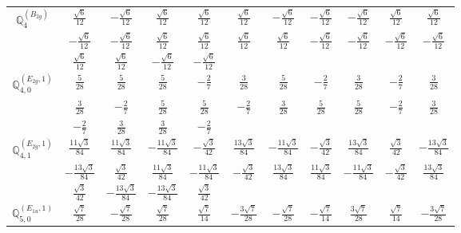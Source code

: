 \documentclass[fleqn,10pt,landscape]{article}
\begin{document}
\begin{itemize}
{\begin{center}
\begin{longtable}{ccccccccccc}
$\mathbb{Q}_{4}^{(B_{2g})}$ & $ \frac{\sqrt{6}}{12} $ & $ - \frac{\sqrt{6}}{12} $ & $ \frac{\sqrt{6}}{12} $ & $ \frac{\sqrt{6}}{12} $ & $ \frac{\sqrt{6}}{12} $ & $ - \frac{\sqrt{6}}{12} $ & $ - \frac{\sqrt{6}}{12} $ & $ - \frac{\sqrt{6}}{12} $ & $ \frac{\sqrt{6}}{12} $ & $ \frac{\sqrt{6}}{12} $ \\
& $ - \frac{\sqrt{6}}{12} $ & $ - \frac{\sqrt{6}}{12} $ & $ \frac{\sqrt{6}}{12} $ & $ \frac{\sqrt{6}}{12} $ & $ \frac{\sqrt{6}}{12} $ & $ \frac{\sqrt{6}}{12} $ & $ - \frac{\sqrt{6}}{12} $ & $ - \frac{\sqrt{6}}{12} $ & $ - \frac{\sqrt{6}}{12} $ & $ - \frac{\sqrt{6}}{12} $ \\
& $ \frac{\sqrt{6}}{12} $ & $ \frac{\sqrt{6}}{12} $ & $ - \frac{\sqrt{6}}{12} $ & $ - \frac{\sqrt{6}}{12} $ & $  $ & $  $ & $  $ & $  $ & $  $ & $  $ \\ \hline
$\mathbb{Q}_{4,0}^{(E_{2g},1)}$ & $ \frac{5}{28} $ & $ \frac{5}{28} $ & $ \frac{5}{28} $ & $ - \frac{2}{7} $ & $ \frac{3}{28} $ & $ \frac{5}{28} $ & $ - \frac{2}{7} $ & $ \frac{3}{28} $ & $ - \frac{2}{7} $ & $ \frac{3}{28} $ \\
& $ \frac{3}{28} $ & $ - \frac{2}{7} $ & $ \frac{5}{28} $ & $ \frac{5}{28} $ & $ - \frac{2}{7} $ & $ \frac{3}{28} $ & $ \frac{5}{28} $ & $ \frac{5}{28} $ & $ - \frac{2}{7} $ & $ \frac{3}{28} $ \\
& $ - \frac{2}{7} $ & $ \frac{3}{28} $ & $ \frac{3}{28} $ & $ - \frac{2}{7} $ & $  $ & $  $ & $  $ & $  $ & $  $ & $  $ \\ \hline
$\mathbb{Q}_{4,1}^{(E_{2g},1)}$ & $ \frac{11 \sqrt{3}}{84} $ & $ \frac{11 \sqrt{3}}{84} $ & $ - \frac{11 \sqrt{3}}{84} $ & $ - \frac{\sqrt{3}}{42} $ & $ \frac{13 \sqrt{3}}{84} $ & $ - \frac{11 \sqrt{3}}{84} $ & $ - \frac{\sqrt{3}}{42} $ & $ \frac{13 \sqrt{3}}{84} $ & $ \frac{\sqrt{3}}{42} $ & $ - \frac{13 \sqrt{3}}{84} $ \\
& $ - \frac{13 \sqrt{3}}{84} $ & $ \frac{\sqrt{3}}{42} $ & $ \frac{11 \sqrt{3}}{84} $ & $ - \frac{11 \sqrt{3}}{84} $ & $ - \frac{\sqrt{3}}{42} $ & $ \frac{13 \sqrt{3}}{84} $ & $ \frac{11 \sqrt{3}}{84} $ & $ - \frac{11 \sqrt{3}}{84} $ & $ - \frac{\sqrt{3}}{42} $ & $ \frac{13 \sqrt{3}}{84} $ \\
& $ \frac{\sqrt{3}}{42} $ & $ - \frac{13 \sqrt{3}}{84} $ & $ - \frac{13 \sqrt{3}}{84} $ & $ \frac{\sqrt{3}}{42} $ & $  $ & $  $ & $  $ & $  $ & $  $ & $  $ \\ \hline
$\mathbb{Q}_{5,0}^{(E_{1u},1)}$ & $ \frac{\sqrt{7}}{28} $ & $ - \frac{\sqrt{7}}{28} $ & $ \frac{\sqrt{7}}{28} $ & $ \frac{\sqrt{7}}{14} $ & $ - \frac{3 \sqrt{7}}{28} $ & $ - \frac{\sqrt{7}}{28} $ & $ - \frac{\sqrt{7}}{14} $ & $ \frac{3 \sqrt{7}}{28} $ & $ \frac{\sqrt{7}}{14} $ & $ - \frac{3 \sqrt{7}}{28} $ \\

\end{longtable}
\end{center}}
\end{itemize}
\end{document}
